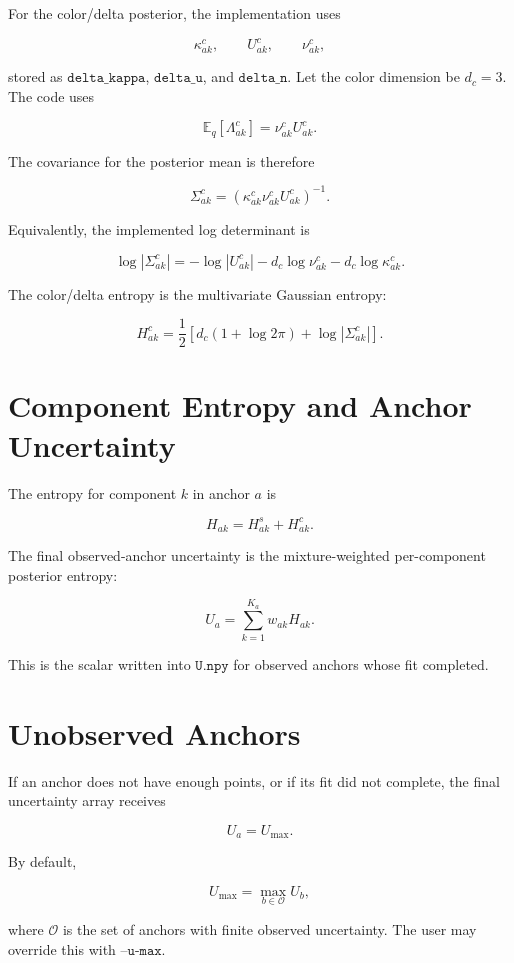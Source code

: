 \documentclass[11pt]{article}
\newcommand{\E}{\mathbb{E}}
\begin{document}
For the color/delta posterior, the implementation uses

\[
  \kappa^c_{ak},
  \qquad
  U^c_{ak},
  \qquad
  \nu^c_{ak},
\]

stored as \(\texttt{delta\_kappa}\), \(\texttt{delta\_u}\), and
\(\texttt{delta\_n}\). Let the color dimension be \(d_c = 3\). The code uses

\[
  \E_q[\Lambda^c_{ak}]
  =
  \nu^c_{ak} U^c_{ak}.
\]

The covariance for the posterior mean is therefore

\[
  \Sigma^c_{ak}
  =
  \left(
    \kappa^c_{ak}\nu^c_{ak}U^c_{ak}
  \right)^{-1}.
\]

Equivalently, the implemented log determinant is

\[
  \log |\Sigma^c_{ak}|
  =
  -\log |U^c_{ak}|
  -
  d_c\log \nu^c_{ak}
  -
  d_c\log \kappa^c_{ak}.
\]

The color/delta entropy is the multivariate Gaussian entropy:

\[
  H^c_{ak}
  =
  \frac{1}{2}
  \left[
    d_c(1 + \log 2\pi)
    +
    \log |\Sigma^c_{ak}|
  \right].
\]

\section{Component Entropy and Anchor Uncertainty}

The entropy for component \(k\) in anchor \(a\) is

\[
  H_{ak}
  =
  H^s_{ak}
  +
  H^c_{ak}.
\]

The final observed-anchor uncertainty is the mixture-weighted per-component
posterior entropy:

\[
  U_a
  =
  \sum_{k=1}^{K_a}
  w_{ak} H_{ak}.
\]

This is the scalar written into \(\texttt{U.npy}\) for observed anchors whose
fit completed.

\section{Unobserved Anchors}

If an anchor does not have enough points, or if its fit did not complete, the
final uncertainty array receives

\[
  U_a = U_{\max}.
\]

By default,

\[
  U_{\max}
  =
  \max_{b \in \mathcal{O}} U_b,
\]

where \(\mathcal{O}\) is the set of anchors with finite observed uncertainty.
The user may override this with \(\texttt{--u-max}\).
\end{document}

